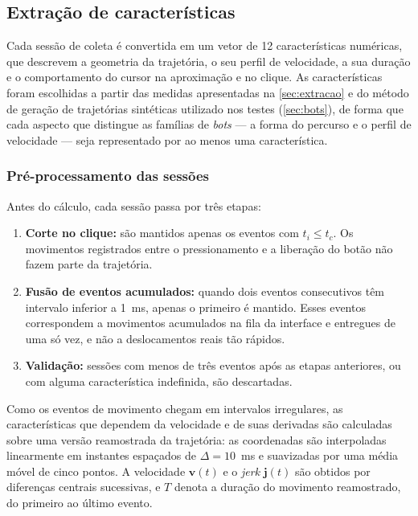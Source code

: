 
\subsection{Extração de características}
\label{sec:caracteristicas}

Cada sessão de coleta é convertida em um vetor de 12 características numéricas, que descrevem a geometria da trajetória, o seu perfil de velocidade, a sua duração e o comportamento do cursor na aproximação e no clique. As características foram escolhidas a partir das medidas apresentadas na \autoref{sec:extracao} e do método de geração de trajetórias sintéticas utilizado nos testes (\autoref{sec:bots}), de forma que cada aspecto que distingue as famílias de \textit{bots} --- a forma do percurso e o perfil de velocidade --- seja representado por ao menos uma característica.

\subsubsection{Pré-processamento das sessões}

Antes do cálculo, cada sessão passa por três etapas:

\begin{enumerate}
    \item \textbf{Corte no clique:} são mantidos apenas os eventos com $t_i \leq t_c$. Os movimentos registrados entre o pressionamento e a liberação do botão não fazem parte da trajetória.
    \item \textbf{Fusão de eventos acumulados:} quando dois eventos consecutivos têm intervalo inferior a 1~ms, apenas o primeiro é mantido. Esses eventos correspondem a movimentos acumulados na fila da interface e entregues de uma só vez, e não a deslocamentos reais tão rápidos.
    \item \textbf{Validação:} sessões com menos de três eventos após as etapas anteriores, ou com alguma característica indefinida, são descartadas.
\end{enumerate}

Como os eventos de movimento chegam em intervalos irregulares, as características que dependem da velocidade e de suas derivadas são calculadas sobre uma versão reamostrada da trajetória: as coordenadas são interpoladas linearmente em instantes espaçados de $\Delta = 10$~ms e suavizadas por uma média móvel de cinco pontos. A velocidade $\mathbf{v}(t)$ e o \textit{jerk} $\mathbf{j}(t)$ são obtidos por diferenças centrais sucessivas, e $T$ denota a duração do movimento reamostrado, do primeiro ao último evento.

